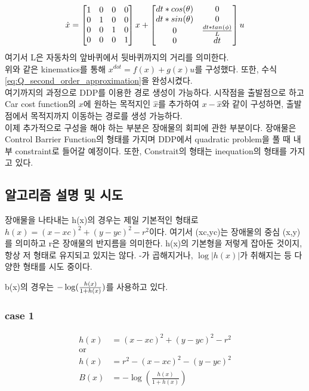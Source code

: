 \documentclass[journal]{IEEEtran}
\begin{document}
\begin{align}
	\dot{x}=\begin{bmatrix} 1&0&0&0\\0&1&0&0\\0&0&1&0\\0&0&0&1 \end{bmatrix}x+
	\begin{bmatrix} dt*cos(\theta)&0 \\dt*sin(\theta)& 0 \\0& {dt*tan(\phi) \over L}\\ 0 &dt \end{bmatrix}u
	\label{eq:kinematics}
\end{align}
여기서 L은 자동차의 앞바퀴에서 뒷바퀴까지의 거리를 의미한다.  \\
위와 같은 kinematics를 통해 $x^{dot}=f(x)+g(x)u$를 구성했다. 또한, 수식 \eqref{eq:Q_second_order_approximation}을 완성시켰다.\\ 여기까지의 과정으로 DDP를 이용한 경로 생성이 가능하다. 시작점을 출발점으로 하고 Car cost function의 $x$에 원하는 목적지인 $\hat{x}$를 추가하여 $x-\hat{x}$와 같이 구성하면, 출발점에서 목적지까지 이동하는 경로를 생성 가능하다.\\
이제 추가적으로 구성을 해야 하는 부분은 장애물의 회피에 관한 부분이다. 장애물은 Control Barrier Function의 형태를 가지며 DDP에서 quadratic problem을 풀 때 내부 constraint로 들어갈 예정이다. 또한, Constrait의 형태는 inequation의 형태를 가지고 있다.



\subsection{알고리즘 설명 및 시도}
장애물을 나타내는 h(x)의 경우는 제일 기본적인 형태로 $h(x)=(x-xc)^2+(y-yc)^2-r^2$이다. 여기서 (xc,yc)는 장애물의 중심 (x,y)를 의미하고 r은 장애물의 반지름을 의미한다. h(x)의 기본형을 저렇게 잡아둔 것이지, 항상 저 형태로 유지되고 있지는 않다. -가 곱해지거나, $\log{\lvert h(x) \rvert}$가 취해지는 등 다양한 형태를 시도 중이다.
 
b(x)의 경우는 $-\log({h(x) \over 1+h(x)})$를 사용하고 있다. 
\\
\subsubsection{case 1}

\begin{align*}
	h(x)&=(x-xc)^2+(y-yc)^2-r^2\\
	\text{or} \\
	h(x)&=r^2-(x-xc)^2-(y-yc)^2\\
	B(x)&=-\log\left( \frac{h(x)}{1+h(x)}\right)
\end{align*}
\\
\end{document}
